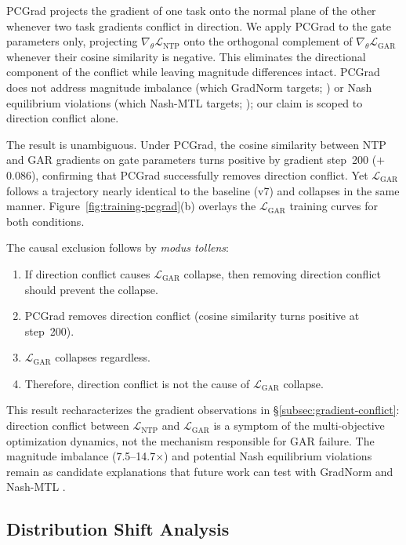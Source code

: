 PCGrad projects the gradient of one task onto the normal plane of the other whenever two task gradients conflict in direction. We apply PCGrad to the gate parameters only, projecting $\nabla_\theta \mathcal{L}_\text{NTP}$ onto the orthogonal complement of $\nabla_\theta \mathcal{L}_\text{GAR}$ whenever their cosine similarity is negative. This eliminates the directional component of the conflict while leaving magnitude differences intact. PCGrad does not address magnitude imbalance (which GradNorm targets; \citealp{chen2018gradnorm}) or Nash equilibrium violations (which Nash-MTL targets; \citealp{navon2022nash}); our claim is scoped to direction conflict alone.

The result is unambiguous. Under PCGrad, the cosine similarity between NTP and GAR gradients on gate parameters turns positive by gradient step~200 ($+$0.086), confirming that PCGrad successfully removes direction conflict. Yet $\mathcal{L}_\text{GAR}$ follows a trajectory nearly identical to the baseline (v7) and collapses in the same manner. Figure~\ref{fig:training-pcgrad}(b) overlays the $\mathcal{L}_\text{GAR}$ training curves for both conditions.

The causal exclusion follows by \emph{modus tollens}:
\begin{enumerate}
    \item If direction conflict causes $\mathcal{L}_\text{GAR}$ collapse, then removing direction conflict should prevent the collapse.
    \item PCGrad removes direction conflict (cosine similarity turns positive at step~200).
    \item $\mathcal{L}_\text{GAR}$ collapses regardless.
    \item Therefore, direction conflict is not the cause of $\mathcal{L}_\text{GAR}$ collapse.
\end{enumerate}

This result recharacterizes the gradient observations in \S\ref{subsec:gradient-conflict}: direction conflict between $\mathcal{L}_\text{NTP}$ and $\mathcal{L}_\text{GAR}$ is a symptom of the multi-objective optimization dynamics, not the mechanism responsible for GAR failure. The magnitude imbalance (7.5--14.7$\times$) and potential Nash equilibrium violations remain as candidate explanations that future work can test with GradNorm \citep{chen2018gradnorm} and Nash-MTL \citep{navon2022nash}.

\subsection{Distribution Shift Analysis}\label{subsec:dist-shift}

